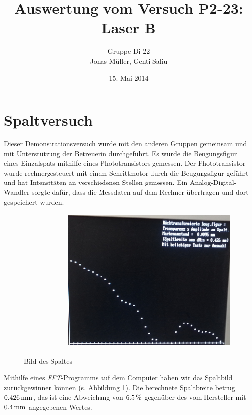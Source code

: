 \documentclass[a4paper,titlepage]{scrartcl}
\title{Auswertung vom Versuch P2-23: Laser B}
\author{Gruppe Di-22\\Jonas Müller, Genti Saliu}
\date{15. Mai 2014}
\numberwithin{equation}{section}
\begin{document}
\begin{titlepage}
\maketitle
\thispagestyle{empty}
\end{titlepage}

\newpage
{}
\tableofcontents

\newpage
{}

\section{Spaltversuch}
Dieser Demonstrationsversuch wurde mit den anderen Gruppen gemeinsam und mit Unterstützung der Betreuerin durchgeführt. Es wurde die Beugungsfigur eines Einzalspats mithilfe eines Phototransistors gemessen. Der Phototransistor wurde rechnergesteuert mit einem Schrittmotor durch die Beugungsfigur geführt und hat Intensitäten an verschiedenen Stellen gemessen. Ein Analog-Digital-Wandler sorgte dafür, dass die Messdaten auf dem Rechner übertragen und dort gespeichert wurden.
\begin{figure}[H]
	\centering
	\begin{tabular}{@{}r@{}}
		\includegraphics[width=0.8\textwidth]{bilder/aufgabe1.png}\\
	\end{tabular}
	\caption{Bild des Spaltes}
	\label{fig:aufgabe1}
\end{figure}
Mithilfe eines \emph{FFT}-Programms auf dem Computer haben wir das Spaltbild zurückgewinnen können (s. Abbildung \ref{fig:aufgabe1}). Die berechnete Spaltbreite betrug $\unit[0.426]{mm}$, das ist eine Abweichung von $\unit[6.5]{\%}$ gegenüber des vom Hersteller mit $\unit[0.4]{mm}$ angegebenen Wertes.
\end{document}
